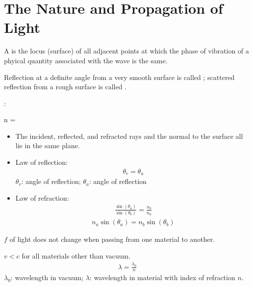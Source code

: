 \chapter{The Nature and Propagation of Light}


    \par A  is the locus (surface) of all adjacent points at
      which the phase of vibration of a phyical quantity associated with the wave
      is the same.


    \par Reflection at a definite angle from a very smooth surface is called
      ; scattered reflection from a rough surface is
      called .
    \par {}:
    \begin{eqbox}
      n = 
    \end{eqbox}
    \begin{itemize}
      \item The incident, reflected, and refracted rays and the normal to the
        surface all lie in the same plane.
      \item Law of reflection:
        \begin{align*}
          \theta_r = \theta_a
        \end{align*}
        $\theta_r$: angle of reflection; $\theta_a$: angle of reflection
      \item Law of refraction:
        \begin{align*}
          \frac{\sin(\theta_a)}{\sin(\theta_b)} = \frac{n_b}{n_a}
        \end{align*}
        \begin{align*}
          n_a \sin(\theta_a) = n_b \sin(\theta_b)
        \end{align*}
    \end{itemize}
    \par $f$ of light does not change when passing from one material to
      another.
    \par $v < c$ for all materials other than vacuum.
    \begin{align*}
      \lambda = \frac{\lambda_0}{n}
    \end{align*}
      $\lambda_0$: wavelength in vacuum; $\lambda$: wavelength in material
        with index of refraction $n$.


